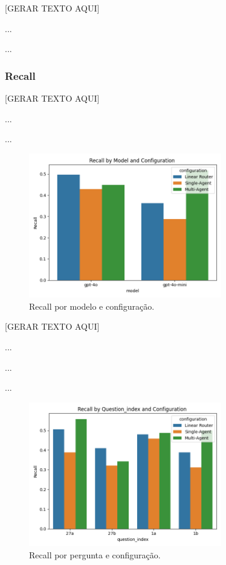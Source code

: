                 [GERAR TEXTO AQUI]

                ...

                ...

            
            \subsubsection{Recall}
            
                [GERAR TEXTO AQUI]

                ...

                ...
                
                \begin{figure}[h!]
                    \centering              
                    \includegraphics[width=0.75\textwidth]{images_part_2/model_recall_model_configuration.png}
                    \caption{Recall por modelo e configuração.}
                    \label{fig:aaaa}
                \end{figure}

                [GERAR TEXTO AQUI]

                ...

                ...

                ...
                
                \begin{figure}[h!]
                    \centering              
                    \includegraphics[width=0.75\textwidth]{images_part_2/question_recall_question_index_configuration.png}
                    \caption{Recall por pergunta e configuração.}
                    \label{fig:question_recall_question_index_configuration}
                \end{figure}


